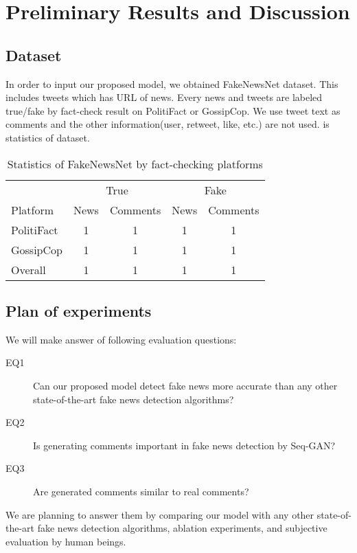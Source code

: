 \section{Preliminary Results and Discussion}
\subsection{Dataset}
In order to input our proposed model, we obtained FakeNewsNet\cite{shu2017exploiting,Shu:2017:FND:3137597.3137600,shu2018fakenewsnet} dataset.
This includes tweets which has URL of news.
Every news and tweets are labeled true/fake by fact-check result on PolitiFact or GossipCop.
We use tweet text as comments and the other information(user, retweet, like, etc.) are not used.
 is statistics of dataset.

\begin{table}[htp]
    \centering
    \caption{Statistics of FakeNewsNet by fact-checking platforms}
    \label{table:fakenewsnet}
    \begin{tabular}{lcccc}
        \hline 
        & \multicolumn{2}{c}{True} & \multicolumn{2}{c}{Fake} \\
        Platform & News & Comments & News & Comments \\
        \hline \hline 
        PolitiFact & 1 & 1 & 1 & 1 \\
        GossipCop & 1 & 1 & 1 & 1 \\
        \hline 
        Overall & 1 & 1 & 1 & 1 \\
        \hline 
    \end{tabular}
\end{table}

\subsection{Plan of experiments}
We will make answer of following evaluation questions:
\begin{description}
    \item[EQ1] Can our proposed model detect fake news more accurate than any other state-of-the-art fake news detection algorithms?
    \item[EQ2] Is generating comments important in fake news detection by Seq-GAN?
    \item[EQ3] Are generated comments similar to real comments?
\end{description}

We are planning to answer them by comparing our model with any other state-of-the-art fake news detection algorithms,
ablation experiments, and subjective evaluation by human beings.

